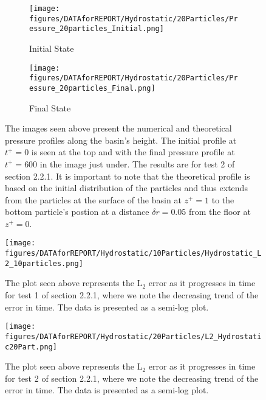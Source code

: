 \documentclass{../GPUSPHtemplate}
\begin{document}
\begin{figure}[H]
  
  \begin{subfigure}{.9\textwidth}
    \centering
    \texttt{[image: figures/DATAforREPORT/Hydrostatic/20Particles/Pressure\_20particles\_Initial.png]}
    \vspace*{5pt}
    \caption{Initial State}
  \end{subfigure}%
  
  \begin{subfigure}{.9\textwidth}
    \centering 
    \texttt{[image: figures/DATAforREPORT/Hydrostatic/20Particles/Pressure\_20particles\_Final.png]}
    \caption{Final State}        
  \end{subfigure}
  
  \caption{The images seen above present the numerical and theoretical pressure profiles along the basin's height. The initial profile at $t^+=0$ is seen at the top and with the final pressure profile at $t^+=600$ in the image just under. The results are for test 2 of section 2.2.1. It is important to note that the theoretical profile is based on the initial distribution of the particles and thus extends from the particles at the surface of the basin at $z^+=1$ to the bottom particle's postion at a distance $\delta r = 0.05 $ from the floor at $z^+=0$. }
  
  \label{fig:HydroExp2}
  
\end{figure}

\begin{figure}[H]
  
  \centering
  \texttt{[image: figures/DATAforREPORT/Hydrostatic/10Particles/Hydrostatic\_L2\_10particles.png]}
  \caption{The plot seen above represents the L$_2$ error as it progresses in time for test 1 of section 2.2.1, where we note the decreasing trend of the error in time. The data is presented as a semi-log plot. }
  \label{fig:HydroExp1L2}	
\end{figure}

\begin{figure}[H]
  
  \centering
  \texttt{[image: figures/DATAforREPORT/Hydrostatic/20Particles/L2\_Hydrostatic20Part.png]}
  \caption{The plot seen above represents the L$_2$ error as it progresses in time for test 2 of section 2.2.1, where we note the decreasing trend of the error in time. The data is presented as a semi-log plot. }
  \label{fig:HydroExp2L2}
\end{figure}



\end{document}
